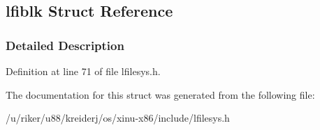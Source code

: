 \hypertarget{structlfiblk}{}\subsection{lfiblk Struct Reference}
\label{structlfiblk}


\subsubsection{Detailed Description}


Definition at line 71 of file lfilesys.\+h.



The documentation for this struct was generated from the following file\+:\begin{DoxyCompactItemize}
\item 
/u/riker/u88/kreiderj/os/xinu-\/x86/include/lfilesys.\+h\end{DoxyCompactItemize}
